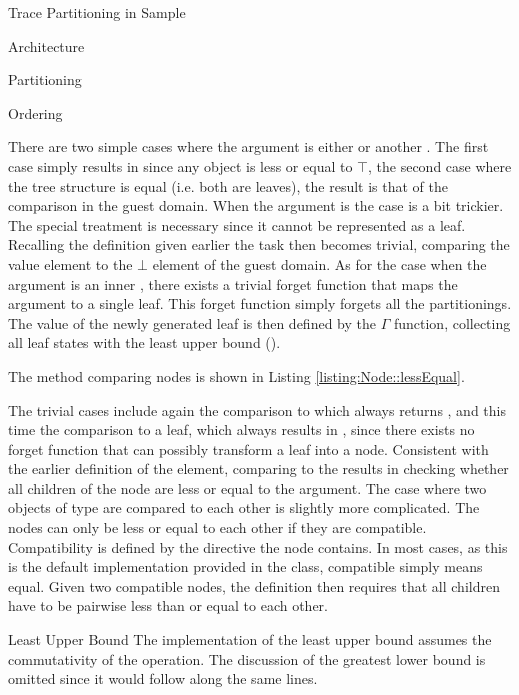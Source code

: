\begin{chapter}{Trace Partitioning in Sample}
\begin{section}{Architecture}
\begin{subsection}{Partitioning}
\begin{subsubsection}{Ordering}
				
				
				There are two simple cases where the argument is either  or another . The first case simply results in  since any object is less or equal to $\top$, the second case where the tree structure is equal (i.e. both are leaves), the result is that of the comparison in the guest domain. When the argument is  the case is a bit trickier. The special treatment is necessary since it cannot be represented as a leaf. Recalling the definition given earlier the task then becomes trivial, comparing the value element to the $\bot$ element of the guest domain. As for the case when the argument is an inner , there exists a trivial forget function that maps the argument to a single leaf. This forget function simply forgets all the partitionings. The value of the newly generated leaf is then defined by the $\Gamma$ function, collecting all leaf states with the least upper bound ().

				The method comparing nodes is shown in Listing \ref{listing:Node::lessEqual}. 

				

				The trivial cases include again the comparison to  which always returns , and this time the comparison to a leaf, which always results in , since there exists no forget function that can possibly transform a leaf into a node. Consistent with the earlier definition of the  element, comparing to the  results in checking whether all children of the node are less or equal to the argument. The case where two objects of type  are compared to each other is slightly more complicated. The nodes can only be less or equal to each other if they are compatible. Compatibility is defined by the directive the node contains. In most cases, as this is the default implementation provided in the  class, compatible simply means equal. Given two compatible nodes, the definition then requires that all children have to be pairwise less than or equal to each other.
			\end{subsubsection}


			\begin{subsubsection}{Least Upper Bound}
				The implementation of the least upper bound assumes the commutativity of the operation. The discussion of the greatest lower bound is omitted since it would follow along the same lines.


\end{subsubsection}
\end{subsection}
\end{section}
\end{chapter}
